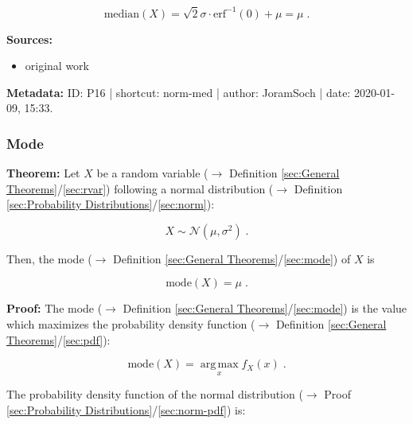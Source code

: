 \documentclass[a4paper,12pt,twoside]{book}
\begin{document}
\begin{equation} \label{eq:norm-med-norm-med-qed}
\mathrm{median}(X) = \sqrt{2}\sigma \cdot \mathrm{erf}^{-1}(0) + \mu = \mu \; .
\end{equation}


\vspace{1em}
\textbf{Sources:}
\begin{itemize}
\item original work\end{itemize}


\vspace{1em}
\textbf{Metadata:} ID: P16 | shortcut: norm-med | author: JoramSoch | date: 2020-01-09, 15:33.
\vspace{1em}



\subsubsection[\textbf{Mode}]{Mode} \label{sec:norm-mode}
\setcounter{equation}{0}

\textbf{Theorem:} Let $X$ be a random variable ($\rightarrow$ Definition \ref{sec:General Theorems}/\ref{sec:rvar}) following a normal distribution ($\rightarrow$ Definition \ref{sec:Probability Distributions}/\ref{sec:norm}):

\begin{equation} \label{eq:norm-mode-norm}
X \sim \mathcal{N}(\mu, \sigma^2) \; .
\end{equation}

Then, the mode ($\rightarrow$ Definition \ref{sec:General Theorems}/\ref{sec:mode}) of $X$ is

\begin{equation} \label{eq:norm-mode-norm-mode}
\mathrm{mode}(X) = \mu \; .
\end{equation}


\vspace{1em}
\textbf{Proof:} The mode ($\rightarrow$ Definition \ref{sec:General Theorems}/\ref{sec:mode}) is the value which maximizes the probability density function ($\rightarrow$ Definition \ref{sec:General Theorems}/\ref{sec:pdf}):

\begin{equation} \label{eq:norm-mode-mode}
\mathrm{mode}(X) = \operatorname*{arg\,max}_x f_X(x) \; .
\end{equation}

The probability density function of the normal distribution ($\rightarrow$ Proof \ref{sec:Probability Distributions}/\ref{sec:norm-pdf}) is:
\end{document}
